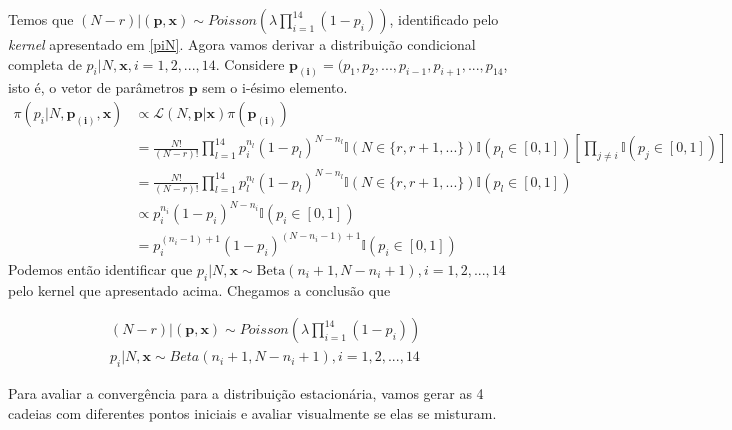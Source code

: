 \documentclass[a4paper,12pt,twoside]{article}
\begin{document}
Temos que $(N-r)|(\mathbf{p,x})\sim Poisson(\lambda\prod_{i=1}^{14}(1-p_i))$, identificado pelo \textit{kernel} apresentado em \ref{piN}.
\newpage
\restoregeometry
Agora vamos derivar a distribuição condicional completa de $p_i|N,\mathbf{x}, i=1,2,...,14$. Considere $\mathbf{p_{(i)}}=(p_1,p_2,...,p_{i-1},p_{i+1},...,p_{14}$, isto é, o vetor de parâmetros $\mathbf{p}$ sem o i-ésimo elemento.
\begin{align*}
\pi(p_i|N,\mathbf{p_{(i)},x})&\propto \mathcal{L}(N,\mathbf{p}|\mathbf{x}) \pi(\mathbf{p_{(i)}})\\
& = \frac{N!}{(N-r)!}\prod_{l=1}^{14}p_{i}^{n_l}(1-p_l)^{N-n_l}\mathds{I}(N \in \{r,r+1,...\})\mathds{I}(p_l \in [0,1])\left[\prod_{j\neq i}\mathds{I}(p_j \in [0,1])\right]\\
& = \frac{N!}{(N-r)!}\prod_{l=1}^{14}p_{l}^{n_l}(1-p_l)^{N-n_l}\mathds{I}(N \in \{r,r+1,...\})\mathds{I}(p_l \in [0,1])\\
& \propto p_i^{n_i}(1-p_i)^{N-n_i}\mathds{I}(p_i \in [0,1])\\
& = p_i^{(n_i-1)+1}(1-p_i)^{(N-n_i-1)+1}\mathds{I}(p_i \in [0,1])
\end{align*}
Podemos então identificar que $p_i|N,\mathbf{x} \sim \text{Beta}(n_i+1,N-n_i+1), i=1,2,...,14$ pelo kernel que apresentado acima. Chegamos a conclusão que 

\begin{align}
& (N-r)|(\mathbf{p,x})\sim Poisson(\lambda\prod_{i=1}^{14}(1-p_i))\\
& p_i|N,\mathbf{x} \sim Beta(n_i+1,N-n_i+1), i=1,2,...,14
\end{align}

Para avaliar a convergência para a distribuição estacionária, vamos gerar as 4 cadeias com diferentes pontos iniciais e avaliar visualmente se elas se misturam.
\end{document}
